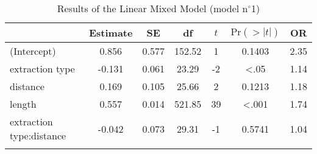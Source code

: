 \begin{table}
\begin{tabular}{l S[table-format=-1.3] S[table-format=1.3] S[table-format=3.2] S[table-format=-1] S[table-format=<1.4] S[table-format=1.2]}
  \lsptoprule
 & {Estimate} & {SE} & {df} & {$t$} & {$\text{Pr}(>|t|)$} & {OR} \\ 
  \midrule
(Intercept) & 0.856 & 0.577 & 152.52 & 1 & 0.1403 & 2.35 \\ 
  extraction type & -0.131 & 0.061 & 23.29 & -2 & <.05 & 1.14 \\ 
  distance & 0.169 & 0.105 & 25.66 & 2 & 0.1213 & 1.18 \\ 
  length & 0.557 & 0.014 & 521.85 & 39 & <.001 & 1.74 \\ 
  extraction type:distance & -0.042 & 0.073 & 29.31 & -1 & 0.5741 & 1.04 \\ 
   \lspbottomrule
\end{tabular}
\caption{Results of the Linear Mixed Model (model n$^{\circ}$1)}
\label{tab:exp03-m1}
\end{table}
